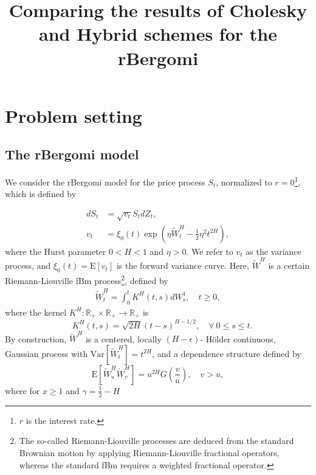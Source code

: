 \documentclass[11pt]{article}
\title{Comparing the results of Cholesky and Hybrid schemes for the rBergomi }
\newcommand{\expt}[1]{\mathrm{E}\left[#1\right]}
\newcommand{\rset}{\mathbb{R}}
\newcommand{\COMMA}{,}
\begin{document}
\maketitle







\thispagestyle{plain}

\setcounter{tocdepth}{1}

%


 \section{Problem setting}\label{sec:Problem setting}

\subsection{The rBergomi model}\label{sec:The rBergomi model}

We consider the rBergomi model for the price process $S_t$, normalized to $r=0$\footnote{$r$ is the interest rate.}, which is defined by

\begin{align}\label{eq:rBergomi_model1}
	dS_t &= \sqrt{v_t} S_t dZ_t, \nonumber \\
	v_t &= \xi_0(t) \exp\left( \eta \widetilde{W}_t^H - \frac{1}{2} \eta^2 t^{2H} \right),
\end{align}
where the Hurst parameter $0 < H < 1$  and  $\eta>0$. We refer to $v_t$ as the variance process, and $\xi_0(t) = \expt{v_t}$ is  the forward variance curve.  Here, $\widetilde{W}^H $ is a certain Riemann-Liouville fBm
process\footnote{The so-called Riemann-Liouville processes are deduced from the standard Brownian motion by applying Riemann-Liouville fractional operators, whereas the standard fBm requires a weighted fractional operator.},  defined by
\begin{align}\label{eq:Volterra process}
	\widetilde{W}_t^H = \int_0^t K^H(t,s) dW_s^1, \quad t \ge 0 \COMMA
\end{align}
where the kernel $K^H : \rset_+ \times \rset_+ \rightarrow \rset_+$ is
\begin{equation*}
 \quad K^H(t,s) = \sqrt{2H} (t-s)^{H - 1/2},\quad \forall \: 0 \le s \le t.
\end{equation*}
By construction, $\widetilde{W}^H $ is a centered, locally $(H-\epsilon)$- H\"older continuous, Gaussian process with $\text{Var}\left[\widetilde{W}^H_t \right] = t^{2H}$, and a dependence structure defined by 
 \begin{equation*}
 \expt{\widetilde{W}^H_u  \widetilde{W}^H_v}=u^{2H} G\left(\frac{v}{u} \right),\quad v >u \COMMA
 \end{equation*}
 where for $x \ge 1$ and $\gamma=\frac{1}{2}-H$
 
\end{document}
